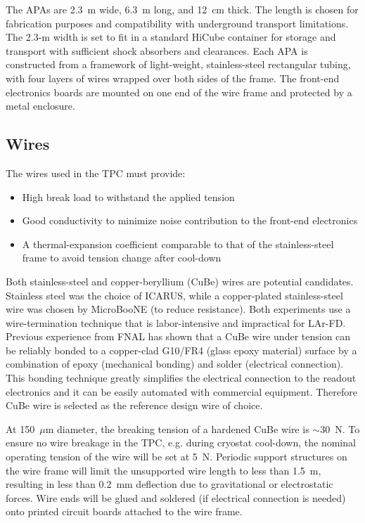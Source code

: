 The APAs are 2.3~m wide, 6.3~m long, and 12~cm thick. The length is chosen for fabrication purposes and compatibility with underground transport limitations. The 2.3-m width is set to fit in a standard HiCube container for storage and transport with sufficient shock absorbers and clearances. 
Each APA is constructed from a framework of light-weight, stainless-steel rectangular tubing, with four layers of wires wrapped over both sides of the frame. The front-end electronics boards are mounted on one end of the wire frame and protected by a metal enclosure.  

\subsection{Wires}

The wires used in the TPC must provide:
\begin{itemize}
\item High break load to withstand the applied tension 
\item Good conductivity to minimize noise contribution to the front-end electronics
\item A thermal-expansion coefficient comparable to that of the stainless-steel 
frame to avoid tension change after cool-down
\end{itemize}

Both stainless-steel and copper-beryllium (CuBe) wires are potential candidates.  
Stainless steel was the choice of ICARUS, while a copper-plated 
stainless-steel wire was chosen by MicroBooNE  (to reduce resistance).  Both experiments use a wire-termination 
technique that is labor-intensive and impractical for LAr-FD. Previous experience from FNAL \cite{FNAL-proto-APA} has shown that a CuBe wire under 
tension can be reliably bonded to a copper-clad G10/FR4 (glass epoxy material) surface by a combination of  epoxy (mechanical bonding) 
and solder (electrical connection).  This bonding technique greatly simplifies the electrical 
connection to the readout electronics and it can be easily automated 
with commercial equipment.  Therefore CuBe wire is 
selected as the reference design wire of choice.

At 150~$\mu$m diameter,  the breaking tension of a hardened CuBe wire is $\sim$30~N.  
To ensure no wire breakage in the TPC, e.g. during cryostat cool-down, the nominal operating tension of the wire will be set at 5~N.  Periodic support structures on the wire frame will
limit the unsupported wire length to less than 1.5~m, resulting in less than 0.2~mm deflection due to gravitational or electrostatic forces.  Wire ends will be glued and soldered (if electrical connection is needed) 
onto printed circuit boards attached to the wire frame.

